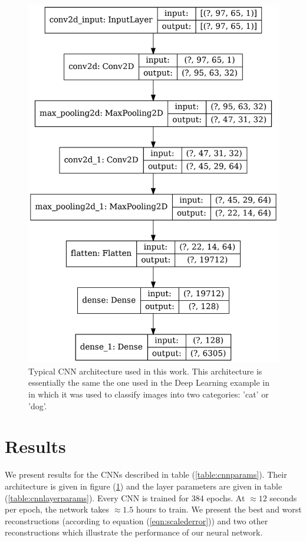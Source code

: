\documentclass[12pt]{article}
\begin{document}
\begin{figure}[!h] 
   \centering
    \includegraphics[totalheight=9cm]{Figures/typical_cnn.png}
    \caption{\label{fig:typical_cnn}Typical CNN architecture used in this work. This architecture is essentially the same the one used in the Deep Learning example in \cite{misc:udemy} in which it was used to classify images into two categories: 'cat' or 'dog'.}
\end{figure}
%
%
\section{Results}
We present results for the CNNs described in table (\ref{table:cnnparams}). Their architecture is given in figure (\ref{fig:typical_cnn}) and the layer parameters are given in table (\ref{table:cnnlayerparams}). Every CNN is trained for 384 epochs. At $\approx{12}$ seconds per epoch, the network takes $\approx{1.5}$ hours to train. We present the best and worst reconstructions (according to equation (\ref{eqn:scalederror})) and two other reconstructions which illustrate the performance of our neural network.
\end{document}
